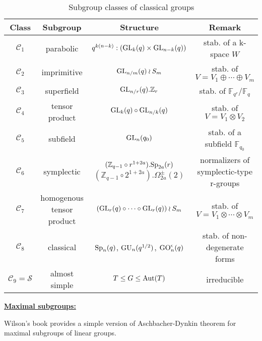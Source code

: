 \documentclass[a4paper,11pt]{article}
\begin{document}
\begin{table*}[htbp]
\centering
\begin{tabular}{cccc}
    \toprule
    Class & Subgroup & Structure & Remark\\
    \midrule
    $\mathscr{C}_1$ & parabolic & $q^{k(n-k)}:(\mathrm{GL}_k(q)\times \mathrm{GL}_{n-k}(q))$ & stab. of a k-space $W$\\
    $\mathscr{C}_2$ & imprimitive & $\mathrm{GL}_{n/m}(q)\wr S_m$ & stab. of $V=V_1\oplus\cdots\oplus V_m$\\
    $\mathscr{C}_3$ & superfield & $\mathrm{GL}_{n/r}(q).\mathbb{Z}_r$ & stab. of $\mathbb{F}_{q^r}/\mathbb{F}_q$\\
    $\mathscr{C}_4$ & tensor product & $\mathrm{GL}_k(q)\circ\mathrm{GL}_{n/k}(q)$ & stab. of $V=V_1\otimes V_2$\\
    $\mathscr{C}_5$ & subfield & $\mathrm{GL}_n(q_0)$ & stab. of a subfield $\mathbb{F}_{q_0}$\\
    $\mathscr{C}_6$ & symplectic & \makecell{$(\mathbb{Z}_{q-1}\circ r^{1+2a}).\mathrm{Sp}_{2a}(r)$\\ $(\mathbb{Z}_{q-1}\circ 2^{1+2a}).\Omega_{2a}^{\pm}(2)$}  & normalizers of symplectic-type r-groups\\
    $\mathscr{C}_7$ & \makecell{homogenous\\ tensor product} & $(\mathrm{GL}_r(q)\circ\cdots\circ\mathrm{GL}_r(q))\wr S_m$ & stab. of $V=V_1\otimes\cdots\otimes V_m$\\
    $\mathscr{C}_8$ & classical & $\mathrm{Sp}_n(q)$, $\mathrm{GU}_n(q^{1/2})$, $\mathrm{GO}_n^\epsilon(q)$ & stab. of non-degenerate forms\\
    $\mathscr{C}_9=\mathscr{S}$ & almost simple & $T\leq G\leq \mathrm{Aut}(T)$ & irreducible\\
    \bottomrule
\end{tabular}
\caption{Subgroup classes of classical groups}
\end{table*}

\noindent\textbf{\underline{Maximal subgroups:}}

Wilson's book provides a simple version of Aschbacher-Dynkin theorem for maximal subgroups of linear groups.
\end{document}
